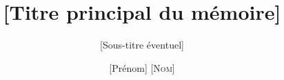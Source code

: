 \documentclass{EPL-master-thesis-covers-FR}
\title{[Titre principal du mémoire]}
\subtitle{[Sous-titre éventuel]}
\author{[Prénom] \textsc{[Nom]}}
\begin{document}
  \maketitle
  \backcoverpage
\end{document}
